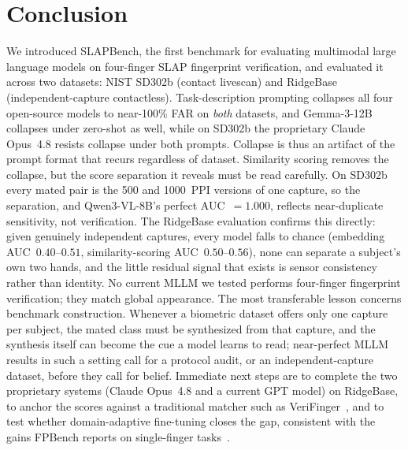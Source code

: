 \documentclass[journal]{IEEEtran}
\begin{document}
\section{Conclusion}
\label{sec:conclusion}

We introduced SLAPBench, the first benchmark for evaluating multimodal
large language models on four-finger SLAP fingerprint verification, and
evaluated it across two datasets: NIST SD302b (contact livescan) and
RidgeBase (independent-capture contactless).
Task-description prompting collapses all four open-source models to
near-100\% FAR on \emph{both} datasets, and Gemma-3-12B collapses under
zero-shot as well, while on SD302b the proprietary Claude Opus~4.8 resists
collapse under both prompts. Collapse is thus an artifact of the prompt
format that recurs regardless of dataset.
Similarity scoring removes the collapse, but the score separation it reveals
must be read carefully. On SD302b every mated pair is the 500 and 1000~PPI
versions of one capture, so the separation, and Qwen3-VL-8B's perfect
AUC~$= 1.000$, reflects near-duplicate sensitivity, not verification. The
RidgeBase evaluation confirms this directly: given genuinely independent
captures, every model falls to chance (embedding AUC~$0.40$--$0.51$,
similarity-scoring AUC~$0.50$--$0.56$), none can separate a subject's own two
hands, and the little residual signal that exists is sensor consistency rather
than identity. No current MLLM we tested performs four-finger fingerprint
verification; they match global appearance.
The most transferable lesson concerns benchmark construction. Whenever a
biometric dataset offers only one capture per subject, the mated class must be
synthesized from that capture, and the synthesis itself can become the cue a
model learns to read; near-perfect MLLM results in such a setting call for a
protocol audit, or an independent-capture dataset, before they call for belief.
Immediate next steps are to complete the two proprietary systems (Claude
Opus~4.8 and a current GPT model) on RidgeBase, to anchor the scores against a
traditional matcher such as VeriFinger~\cite{verifinger}, and to test whether
domain-adaptive fine-tuning closes the gap, consistent with the gains FPBench
reports on single-finger tasks~\cite{fpbench2025}.

{\footnotesize


}
\end{document}

